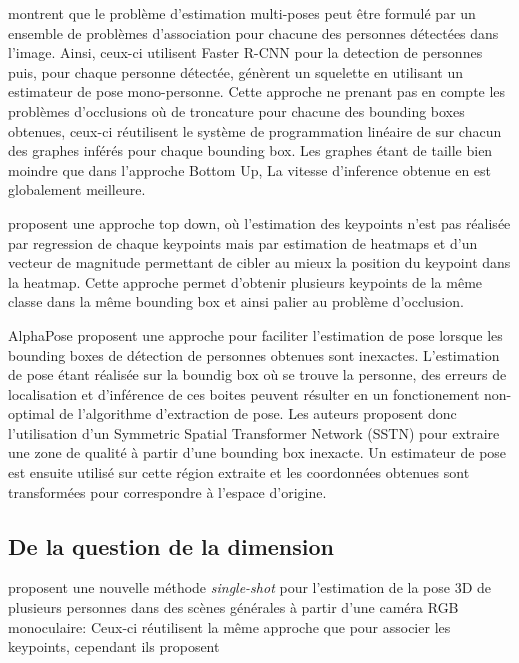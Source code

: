 \cite{2016arXiv160808526I} montrent que le problème d'estimation multi-poses peut être formulé par un ensemble de problèmes d'association pour chacune des personnes détectées dans l'image. Ainsi, ceux-ci utilisent Faster R-CNN pour la detection de personnes puis, pour chaque personne détectée, génèrent un squelette en utilisant un estimateur de pose mono-personne. Cette approche ne prenant pas en compte les problèmes d'occlusions où de troncature pour chacune des bounding boxes obtenues, ceux-ci réutilisent le système de programmation linéaire de \cite{2015arXiv151106645P} sur chacun des graphes inférés pour chaque bounding box. Les graphes étant de taille bien moindre que dans l'approche Bottom Up, La vitesse d'inference obtenue en est globalement meilleure.

\cite{2017arXiv170101779P} proposent une approche top down, où l'estimation des keypoints n'est pas réalisée par regression de chaque keypoints mais par estimation de heatmaps et d'un vecteur de magnitude permettant de cibler au mieux la position du keypoint dans la heatmap. Cette approche permet d'obtenir plusieurs keypoints de la même classe dans la même bounding box et ainsi palier au problème d'occlusion. 

AlphaPose \cite{fang2017rmpe} proposent une approche pour faciliter l'estimation de pose lorsque les bounding boxes de détection de personnes obtenues sont inexactes. L'estimation de pose étant réalisée sur la boundig box où se trouve la personne, des erreurs de localisation et d'inférence de ces boites peuvent résulter en un fonctionement non-optimal de l'algorithme d'extraction de pose. Les auteurs proposent donc l'utilisation d'un Symmetric Spatial Transformer Network (SSTN) pour extraire une zone de qualité à partir d'une bounding box inexacte. Un estimateur de pose est ensuite utilisé sur cette région extraite et les coordonnées obtenues sont transformées pour correspondre à l'espace d'origine.



\subsection{De la question de la dimension}

\cite{singleshotmultiperson2018} proposent une nouvelle méthode \textit{single-shot} pour l'estimation de la pose 3D de plusieurs personnes dans des scènes générales à partir d'une caméra RGB monoculaire: Ceux-ci réutilisent la même approche que \cite{cao2017realtime} pour associer les keypoints, cependant ils proposent 


